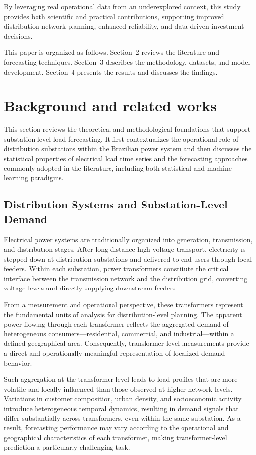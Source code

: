 By leveraging real operational data from an underexplored context, this study provides both scientific and practical contributions, supporting improved distribution network planning, enhanced reliability, and data-driven investment decisions.

This paper is organized as follows. Section~2 reviews the literature and forecasting techniques. Section~3 describes the methodology, datasets, and model development. Section~4 presents the results and discusses the findings.

\section{Background and related works}
\label{sec:1}

This section reviews the theoretical and methodological foundations that support substation-level load forecasting. It first contextualizes the operational role of distribution substations within the Brazilian power system and then discusses the statistical properties of electrical load time series and the forecasting approaches commonly adopted in the literature, including both statistical and machine learning paradigms.

\subsection{Distribution Systems and Substation-Level Demand}

Electrical power systems are traditionally organized into generation, transmission, and distribution stages. After long-distance high-voltage transport, electricity is stepped down at distribution substations and delivered to end users through local feeders. Within each substation, power transformers constitute the critical interface between the transmission network and the distribution grid, converting voltage levels and directly supplying downstream feeders.

From a measurement and operational perspective, these transformers represent the fundamental units of analysis for distribution-level planning. The apparent power flowing through each transformer reflects the aggregated demand of heterogeneous consumers—residential, commercial, and industrial—within a defined geographical area. Consequently, transformer-level measurements provide a direct and operationally meaningful representation of localized demand behavior.

Such aggregation at the transformer level leads to load profiles that are more volatile and locally influenced than those observed at higher network levels. Variations in customer composition, urban density, and socioeconomic activity introduce heterogeneous temporal dynamics, resulting in demand signals that differ substantially across transformers, even within the same substation. As a result, forecasting performance may vary according to the operational and geographical characteristics of each transformer, making transformer-level prediction a particularly challenging task.

